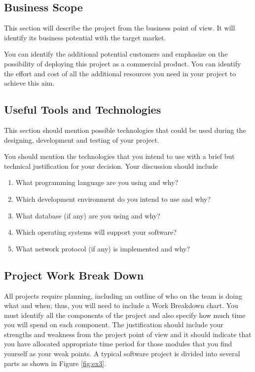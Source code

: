\subsection{Business Scope}
This section will describe the project from the business point of view. 
It will identify its business potential with the target market. 

You can identify the additional potential customers and emphasize on the possibility of deploying this project as a commercial product. 
You can identify the effort and cost of all the additional resources you need in your project to achieve this aim.


\subsection{Useful Tools and Technologies}
This section should mention possible technologies that could be used during the designing, development and testing of your project.

You should mention the technologies that you intend to use with a brief but technical justification for your decision. Your discussion should include

\begin{enumerate}
    \item What programming language are you using and why?
    \item Which development environment do you intend to use and why?
    \item What database (if any) are you using and why?
    \item Which operating systems will support your software?
    \item What network protocol (if any) is implemented and why?
\end{enumerate}

\subsection{Project Work Break Down}
All projects require planning, including an outline of who on the team is doing what and when; thus, you will need to include a Work Breakdown chart. You must identify all the components of the project and also specify how much time you will spend on each component. The justification should include your strengths and weakness from the project point of view and it should indicate that you have allocated appropriate time period for those modules that you find yourself as your weak points. A typical software project is divided into several parts as shown in Figure \ref{fig:ex3}.

